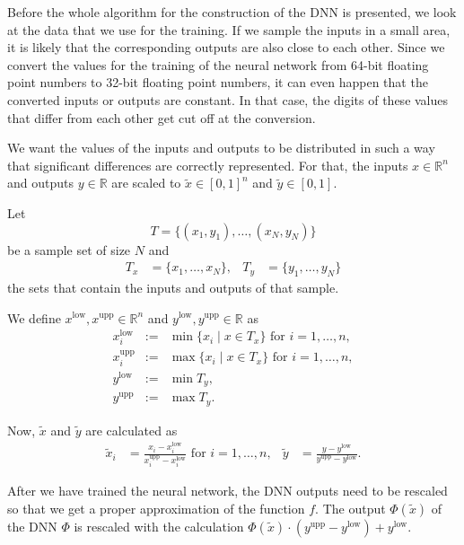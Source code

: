 Before the whole algorithm for the construction of the DNN is presented, we look at the data that we use for the training. If we sample the inputs in a small area, it is likely that the corresponding outputs are also close to each other. Since we convert the values for the training of the neural network from 64-bit floating point numbers to 32-bit floating point numbers, it can even happen that the converted inputs or outputs are constant. In that case, the digits of these values that differ from each other get cut off at the conversion.

We want the values of the inputs and outputs to be distributed in such a way that significant differences are correctly represented. For that, the inputs $x\in\mathbb{R}^n$ and outputs $y\in\mathbb{R}$ are scaled to $\tilde{x}\in[0,1]^n$ and $\tilde{y}\in[0,1]$.

Let
\begin{equation}
T=\{(x_1,y_1),\dotsc,(x_N,y_N)\}
\end{equation}
be a sample set of size $N$ and
\begin{align*}
T_x&=\{x_1,\dotsc,x_N\},&T_y&=\{y_1,\dotsc,y_N\}
\end{align*}
the sets that contain the inputs and outputs of that sample.

We define $x^\mathrm{low}, x^\mathrm{upp}\in\mathbb{R}^n$ and $y^\mathrm{low}, y^\mathrm{upp}\in\mathbb{R}$ as
\begin{eqnarray}
\label{minIn}
x^\mathrm{low}_i&:=&\operatorname*{min}\{x_i\mid x\in T_x\}\text{ for }i=1,\dotsc,n,\\
\label{maxIn}
x^\mathrm{upp}_i&:=&\operatorname*{max}\{x_i\mid x\in T_x\}\text{ for }i=1,\dotsc,n,\\
\label{minOut}
y^\mathrm{low}&:=&\operatorname*{min}T_y,\\
\label{maxOut}
y^\mathrm{upp}&:=&\operatorname*{max}T_y.
\end{eqnarray}

Now, $\tilde{x}$ and $\tilde{y}$ are calculated as
\begin{align}
\label{scalingToZeroOne}
\tilde{x}_i&=\frac{x_i-x^\mathrm{low}_i}{x^\mathrm{upp}_i-x^\mathrm{low}_i}\text{ for }i=1,\dotsc,n,&\tilde{y}&=\frac{y-y^\mathrm{low}}{y^\mathrm{upp}-y^\mathrm{low}}.
\end{align}

After we have trained the neural network, the DNN outputs need to be rescaled so that we get a proper approximation of the function $f$. The output $\Phi(\tilde{x})$ of the DNN $\Phi$ is rescaled with the calculation $\Phi(\tilde{x})\cdot(y^\mathrm{upp}-y^\mathrm{low})+y^\mathrm{low}$.

